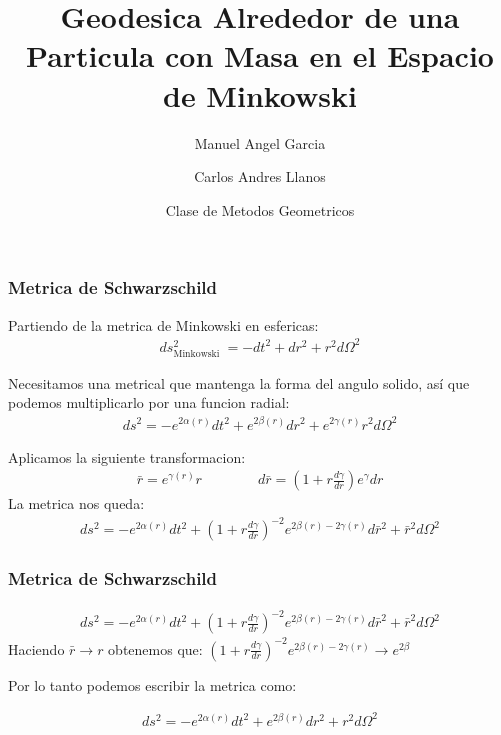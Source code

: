 \documentclass{beamer}
\title[Geodesica en Espacio de Minkowski] %
{Geodesica Alrededor de una Particula con Masa en el Espacio de Minkowski}
\author[] %
{Manuel Angel Garcia\inst{1} \and Carlos Andres Llanos\inst{1}}
\institute[] %
{
  \inst{1}%
  Facultad de Fisica\\
  Universidad Nacional de Colombia
}
\date[2023] %
{Clase de Metodos Geometricos}
\begin{document}
\frame{\titlepage}

\begin{frame}
\frametitle{Metrica de Schwarzschild}

Partiendo de la metrica de Minkowski en esfericas: 
\begin{gather*}
  ds^2 _{\text{Minkowski }}  = - dt^2 + dr^2 + r^2 d \Omega^2
\end{gather*}

Necesitamos una metrical que mantenga la forma del angulo solido, así que podemos multiplicarlo por una funcion radial:
\begin{gather*}
  ds^2 = - e ^ {2 \alpha (r) } dt^2 + e ^ {2 \beta(r) } dr^2 + e ^ {2\gamma(r)}r^2 d \Omega^2 
\end{gather*}

Aplicamos la siguiente transformacion: 
\begin{gather*}
  \bar r = e ^ {\gamma(r)}r \qquad \qquad d\bar r = \left(1 + r \frac{d \gamma  }{d r }\right)e ^ {\gamma } dr 
\end{gather*}
La metrica nos queda: 
\begin{gather*}
  ds^2 = - e ^ {2 \alpha(r)}dt^2 + \left(1 + r \frac{d \gamma  }{d r }\right)^ {-2 } e ^ {2 \beta (r) - 2 \gamma (r) }d \bar r ^2 + \bar r ^2 d \Omega^2 
\end{gather*}

\end{frame}




\begin{frame}
\frametitle{Metrica de Schwarzschild}

\begin{gather*}
  ds^2 = - e ^ {2 \alpha(r)}dt^2 + \left(1 + r \frac{d \gamma  }{d r }\right)^ {-2 } e ^ {2 \beta (r) - 2 \gamma (r) }d \bar r ^2 + \bar r ^2 d \Omega^2 
\end{gather*}
Haciendo $ \bar r \rightarrow r  $ obtenemos que: $ \left(1 + r \frac{d \gamma  }{d r }\right)^ {-2 } e ^ {2 \beta (r) - 2 \gamma (r) } \rightarrow e ^ {2 \beta } $

\hfill 

\hfill 

Por lo tanto podemos escribir la metrica como: 

\begin{gather*}
  ds^2 = - e ^ {2\alpha(r)}dt^2 + e ^ {2 \beta (r) } dr^2 + r^2 d \Omega^2  
\end{gather*}

\end{frame}
\end{document}
